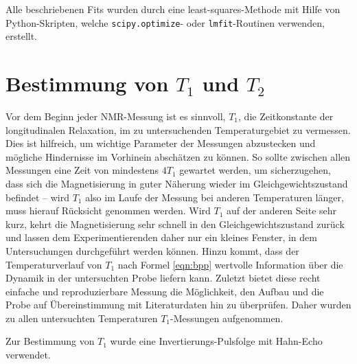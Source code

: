 Alle beschriebenen Fits wurden durch eine least-squares-Methode mit Hilfe von Python-Skripten, welche \texttt{scipy.optimize}- oder \texttt{lmfit}-Routinen verwenden, erstellt.


\section{Bestimmung von $T_1$ und $T_2$} \label{section:res:T_1}

Vor dem Beginn jeder NMR-Messung ist es sinnvoll, $T_1$, die Zeitkonstante der longitudinalen Relaxation, im zu untersuchenden Temperaturgebiet zu vermessen. Dies ist hilfreich, um wichtige Parameter der Messungen abzustecken und mögliche Hindernisse im Vorhinein abschätzen zu können. So sollte zwischen allen Messungen eine Zeit von mindestens $4 T_1$ gewartet werden, um sicherzugehen, dass sich die Magnetisierung in guter Näherung wieder im Gleichgewichtszustand befindet -- wird $T_1$ also im Laufe der Messung bei anderen Temperaturen länger, muss hierauf Rücksicht genommen werden. Wird $T_1$ auf der anderen Seite sehr kurz, kehrt die Magnetisierung sehr schnell in den Gleichgewichtszustand zurück und lassen dem Experimentierenden daher nur ein kleines Fenster, in dem Untersuchungen durchgeführt werden können. Hinzu kommt, dass der Temperaturverlauf von $T_1$ nach Formel \eqref{eqn:bpp} wertvolle Information über die Dynamik in der untersuchten Probe liefern kann. Zuletzt bietet diese recht einfache und reproduzierbare Messung die Möglichkeit, den Aufbau und die Probe auf Übereinstimmung mit Literaturdaten hin zu überprüfen. Daher wurden zu allen untersuchten Temperaturen $T_1$-Messungen aufgenommen.

Zur Bestimmung von $T_1$ wurde eine Invertierungs-Pulsfolge mit Hahn-Echo verwendet.

